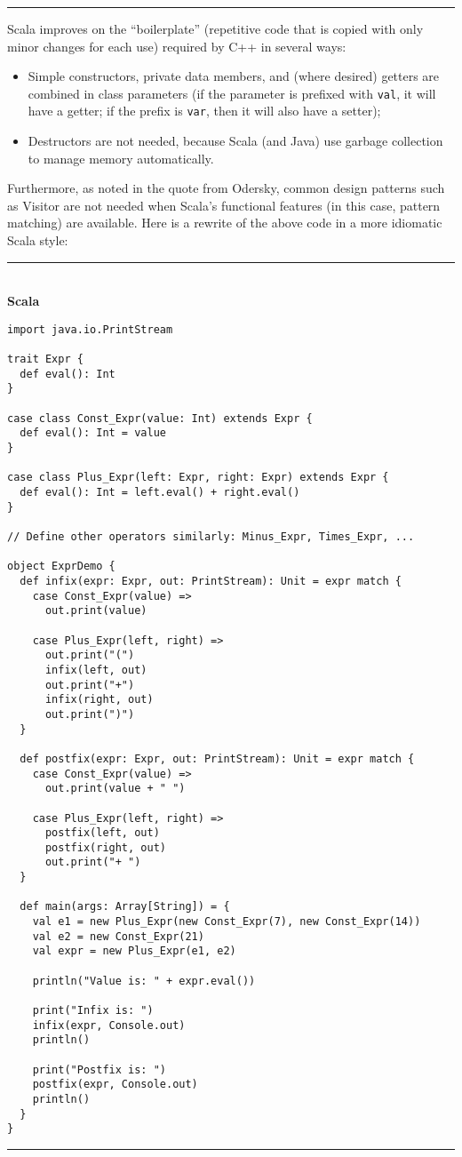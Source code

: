 \documentclass[11pt]{article}
\begin{document}
\rule{\textwidth}{1pt}

Scala improves on the ``boilerplate'' (repetitive code that is copied with only minor changes for each use) required by C++ in several ways:
\begin{itemize}
\item Simple constructors, private data members, and (where desired) getters are combined in class parameters (if the parameter is prefixed with \verb|val|, it will have a getter; if the prefix is \verb|var|, then it will also have a setter);
\item Destructors are not needed, because Scala (and Java) use garbage collection to manage memory automatically.
\end{itemize}
Furthermore, as noted in the quote from Odersky, common design patterns such as Visitor are not needed when Scala's functional features (in this case, pattern matching) are available. Here is a rewrite of the above code in a more idiomatic Scala style:

\noindent\rule{\textwidth}{1pt}\\\textbf{Scala}
\begin{verbatim}
import java.io.PrintStream

trait Expr {
  def eval(): Int
}

case class Const_Expr(value: Int) extends Expr {
  def eval(): Int = value
}

case class Plus_Expr(left: Expr, right: Expr) extends Expr {
  def eval(): Int = left.eval() + right.eval()
}

// Define other operators similarly: Minus_Expr, Times_Expr, ...

object ExprDemo {
  def infix(expr: Expr, out: PrintStream): Unit = expr match {
    case Const_Expr(value) =>
      out.print(value)

    case Plus_Expr(left, right) =>
      out.print("(")
      infix(left, out)
      out.print("+")
      infix(right, out)
      out.print(")")
  }

  def postfix(expr: Expr, out: PrintStream): Unit = expr match {
    case Const_Expr(value) =>
      out.print(value + " ")

    case Plus_Expr(left, right) =>
      postfix(left, out)
      postfix(right, out)
      out.print("+ ")
  }

  def main(args: Array[String]) = {
    val e1 = new Plus_Expr(new Const_Expr(7), new Const_Expr(14))
    val e2 = new Const_Expr(21)
    val expr = new Plus_Expr(e1, e2)

    println("Value is: " + expr.eval())

    print("Infix is: ")
    infix(expr, Console.out)
    println()

    print("Postfix is: ")
    postfix(expr, Console.out)
    println()
  }
}
\end{verbatim}
\rule{\textwidth}{1pt}
\end{document}

